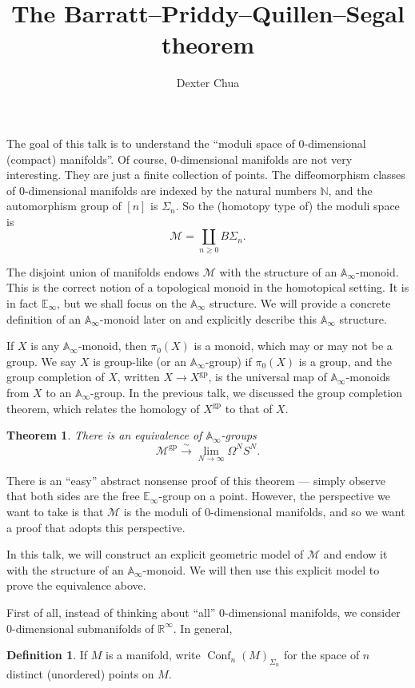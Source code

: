 \documentclass{shortart}
\title{The Barratt--Priddy--Quillen--Segal theorem}
\author{Dexter Chua}
\newtheorem{thm}[lemma]{Theorem}
\theoremstyle{definition}
\newtheorem{defi}[lemma]{Definition}
\DeclareMathOperator\Conf{Conf}
\newcommand\A{\mathbb{A}}
\newcommand\E{\mathbb{E}}
\newcommand\N{\mathbb{N}}
\newcommand\R{\mathbb{R}}
\newcommand\gp{\mathrm{gp}}
\begin{document}
The goal of this talk is to understand the ``moduli space of $0$-dimensional (compact) manifolds''. Of course, $0$-dimensional manifolds are not very interesting. They are just a finite collection of points. The diffeomorphism classes of $0$-dimensional manifolds are indexed by the natural numbers $\N$, and the automorphism group of $[n]$ is $\Sigma_n$. So the (homotopy type of) the moduli space is
\[
  \mathcal{M} = \coprod_{n \geq 0} B \Sigma_n.
\]

The disjoint union of manifolds endows $\mathcal{M}$ with the structure of an $\A_\infty$-monoid. This is the correct notion of a topological monoid in the homotopical setting. It is in fact $\E_\infty$, but we shall focus on the $\A_\infty$ structure. We will provide a concrete definition of an $\A_\infty$-monoid later on and explicitly describe this $\A_\infty$ structure.

If $X$ is any $\A_\infty$-monoid, then $\pi_0(X)$ is a monoid, which may or may not be a group. We say $X$ is group-like (or an $\A_\infty$-group) if $\pi_0(X)$ is a group, and the group completion of $X$, written $X \to X^{\gp}$, is the universal map of $\A_\infty$-monoids from $X$ to an $\A_\infty$-group. In the previous talk, we discussed the group completion theorem, which relates the homology of $X^\gp$ to that of $X$.

\begin{thm}
  There is an equivalence of $\A_\infty$-groups
  \[
    \mathcal{M}^{\gp} \overset{\sim}{\to} \lim_{N \to \infty} \Omega^N S^N.
  \]
\end{thm}

There is an ``easy'' abstract nonsense proof of this theorem --- simply observe that both sides are the free $\E_\infty$-group on a point. However, the perspective we want to take is that $\mathcal{M}$ is the moduli of $0$-dimensional manifolds, and so we want a proof that adopts this perspective.

In this talk, we will construct an explicit geometric model of $\mathcal{M}$ and endow it with the structure of an $\A_\infty$-monoid. We will then use this explicit model to prove the equivalence above.

First of all, instead of thinking about ``all'' $0$-dimensional manifolds, we consider $0$-dimensional submanifolds of $\R^\infty$. In general,

\begin{defi}
  If $M$ is a manifold, write $\Conf_n(M)_{\Sigma_n}$ for the space of $n$ distinct (unordered) points on $M$.
\end{defi}
\end{document}
